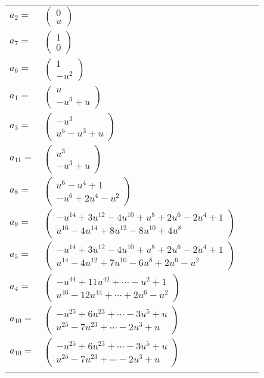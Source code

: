 \documentclass[1p]{elsarticle_modified}
\theoremstyle{definition}
\begin{document}
\begin{tabular}{m{7pt} m{180pt} m{7pt} m{180pt} }
\flushright $a_{2}=$&$\begin{pmatrix}0\\u\end{pmatrix}$ \\
\flushright $a_{7}=$&$\begin{pmatrix}1\\0\end{pmatrix}$ \\
\flushright $a_{6}=$&$\begin{pmatrix}1\\- u^2\end{pmatrix}$ \\
\flushright $a_{1}=$&$\begin{pmatrix}u\\- u^3+u\end{pmatrix}$ \\
\flushright $a_{3}=$&$\begin{pmatrix}- u^3\\u^5- u^3+u\end{pmatrix}$ \\
\flushright $a_{11}=$&$\begin{pmatrix}u^3\\- u^3+u\end{pmatrix}$ \\
\flushright $a_{8}=$&$\begin{pmatrix}u^6- u^4+1\\- u^6+2 u^4- u^2\end{pmatrix}$ \\
\flushright $a_{9}=$&$\begin{pmatrix}- u^{14}+3 u^{12}-4 u^{10}+u^8+2 u^6-2 u^4+1\\u^{16}-4 u^{14}+8 u^{12}-8 u^{10}+4 u^8\end{pmatrix}$ \\
\flushright $a_{5}=$&$\begin{pmatrix}- u^{14}+3 u^{12}-4 u^{10}+u^8+2 u^6-2 u^4+1\\u^{14}-4 u^{12}+7 u^{10}-6 u^8+2 u^6- u^2\end{pmatrix}$ \\
\flushright $a_{4}=$&$\begin{pmatrix}- u^{44}+11 u^{42}+\cdots- u^2+1\\u^{46}-12 u^{44}+\cdots+2 u^6- u^2\end{pmatrix}$ \\
\flushright $a_{10}=$&$\begin{pmatrix}- u^{25}+6 u^{23}+\cdots-3 u^5+u\\u^{25}-7 u^{23}+\cdots-2 u^3+u\end{pmatrix}$\\ \flushright $a_{10}=$&$\begin{pmatrix}- u^{25}+6 u^{23}+\cdots-3 u^5+u\\u^{25}-7 u^{23}+\cdots-2 u^3+u\end{pmatrix}$\\&\end{tabular}
\end{document}
